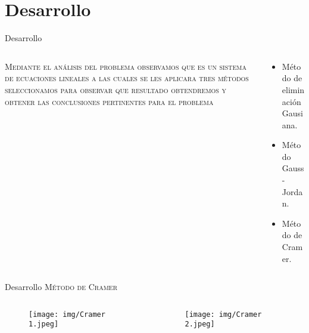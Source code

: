 \documentclass{cubeamer}
\begin{document}
\section{Desarrollo}

\begin{frame}{Desarrollo}
\begin{columns}
    \begin{column}{0.7\textwidth}
    \textsc{Mediante el análisis del problema observamos que es un sistema de ecuaciones lineales a las cuales se les aplicara tres métodos seleccionamos para observar que resultado obtendremos y obtener las conclusiones pertinentes para el problema}
    \end{column}
     \begin{column}{0.4\textwidth}
     \begin{itemize}
      \item Método de eliminación Gausiana.
      \item Método Gauss-Jordan.
      \item Método de Cramer.
\end{itemize}
     \end{column}
\end{columns}
\end{frame}

\begin{frame}{Desarrollo}
    \textsc{Método de Cramer}
   \begin{columns}
        \begin{column}{0.5\textwidth}
            \begin{figure}
                \centering
                \texttt{[image: img/Cramer 1.jpeg]}
            \end{figure}
        \end{column}
        \begin{column}{0.5\textwidth}
        \begin{figure}
                \centering
                \texttt{[image: img/Cramer 2.jpeg]}
            \end{figure}
        \end{column}
    \end{columns}   
    

\end{frame}
\end{document}
